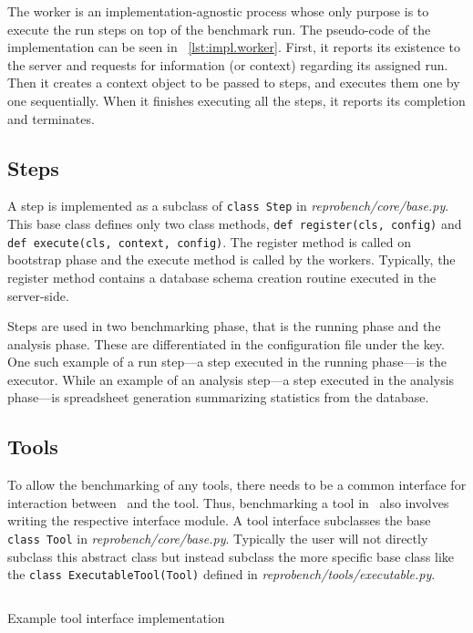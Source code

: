 The worker is an implementation-agnostic process whose only purpose is to execute the run steps on top of the benchmark run.
The pseudo-code of the implementation can be seen in \lst~\ref{lst:impl.worker}.
First, it reports its existence to the server and requests for information (or context) regarding its assigned run.
Then it creates a context object to be passed to steps, and executes them one by one sequentially.
When it finishes executing all the steps, it reports its completion and terminates.

\subsection{Steps}
\label{sec:impl.steps}

A step is implemented as a subclass of \texttt{class Step} in \emph{reprobench/core/base.py}.
This base class defines only two class methods, \texttt{def register(cls, config)} and \texttt{def execute(cls, context, config)}.
The register method is called on bootstrap phase and the execute method is called by the workers.
Typically, the register method contains a database schema creation routine executed in the server-side.

Steps are used in two benchmarking phase, that is the running phase and the analysis phase.
These are differentiated in the configuration file under the  key.
One such example of a run step---a step executed in the running phase---is the executor.
While an example of an analysis step---a step executed in the analysis phase---is spreadsheet generation summarizing statistics from the database.

\subsection{Tools}
\label{sec:impl.tools}

To allow the benchmarking of any tools, there needs to be a common interface for interaction between \OurBenchmarkingTool~and the tool.
Thus, benchmarking a tool in \OurBenchmarkingTool~also involves writing the respective interface module.
A tool interface subclasses the base \texttt{class Tool} in \emph{reprobench/core/base.py}.
Typically the user will not directly subclass this abstract class but instead subclass the more specific base class like the \texttt{class ExecutableTool(Tool)} defined in \emph{reprobench/tools/executable.py}.

\begin{listing}
    \inputminted[firstline=12]{python}{assets/listings/reprobench/examples/sat/tools/glucose.py}
    \caption{Example tool interface implementation}
    \label{lst:impl.tool.example}
\end{listing}

